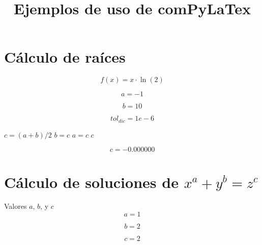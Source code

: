 \documentclass{article}
\title{Ejemplos de uso de comPyLaTex}
\author{}
\date{}
\begin{document}
\maketitle


\section{Cálculo de raíces}

\begin{equation}
f(x) = x \cdot \ln(2)
\label{eq:calc:f}
\end{equation}

\begin{equation}
a = -1
\label{eq:calc:a}
\end{equation}

\begin{equation}
b = 10
\label{eq:calc:b}
\end{equation}

\begin{equation}
    tol_{dic} = 1e-6
    \label{eq:calc:toldic}
\end{equation}

\begin{algorithm}
\caption{Método de dicotomía}
\label{alg:calc:dicotomia}
\begin{algorithmic}
    \STATE $c = (a + b)/2$
        \STATE $b = c$
    \ELSE
        \STATE $a = c$
    \ENDIF
\ENDWHILE
\RETURN $c$
\end{algorithmic}
\end{algorithm}

\begin{equation}
    c = 
    -0.000000
    \label{eq:res:c}
\end{equation}

\section{Cálculo de soluciones de $x^a + y^b = z^c$}

Valores $a$, $b$, y $c$
\begin{equation}
a = 1
\label{eq:calc:a}
\end{equation}

\begin{equation}
b = 2
\label{eq:calc:b}
\end{equation}

\begin{equation}
c = 2
\label{eq:calc:c}
\end{equation}
\end{document}
